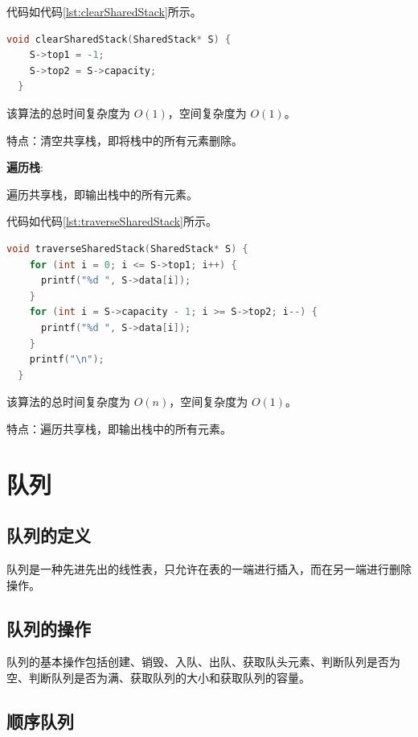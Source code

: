 \documentclass[lang=cn,newtx,10pt,scheme=chinese]{../elegantbook}
\begin{document}
代码如代码\ref{lst:clearSharedStack}所示。

\begin{lstlisting}[language=C++, caption={清空共享栈示例代码}, label={lst:clearSharedStack}]
  void clearSharedStack(SharedStack* S) {
    S->top1 = -1;
    S->top2 = S->capacity;
  }

\end{lstlisting}

该算法的总时间复杂度为 $O(1)$，空间复杂度为 $O(1)$。

特点：清空共享栈，即将栈中的所有元素删除。

\textbf{遍历栈}:

遍历共享栈，即输出栈中的所有元素。

代码如代码\ref{lst:traverseSharedStack}所示。

\begin{lstlisting}[language=C++, caption={遍历共享栈示例代码}, label={lst:traverseSharedStack}]
  void traverseSharedStack(SharedStack* S) {
    for (int i = 0; i <= S->top1; i++) {
      printf("%d ", S->data[i]);
    }
    for (int i = S->capacity - 1; i >= S->top2; i--) {
      printf("%d ", S->data[i]);
    }
    printf("\n");
  }

\end{lstlisting}

该算法的总时间复杂度为 $O(n)$，空间复杂度为 $O(1)$。

特点：遍历共享栈，即输出栈中的所有元素。


\section{队列}



\subsection{队列的定义}

队列是一种先进先出的线性表，只允许在表的一端进行插入，而在另一端进行删除操作。


\subsection{队列的操作}

队列的基本操作包括创建、销毁、入队、出队、获取队头元素、判断队列是否为空、判断队列是否为满、获取队列的大小和获取队列的容量。


\subsection{顺序队列}
\end{document}

